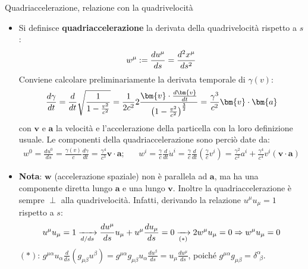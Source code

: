 \documentclass[a4_2,grid,frame]{flashcards}
\newenvironment{cartaflash}
    {\vspace{-15pt}
    \begin{itemize}
    }
    {
    \end{itemize}
    }
\begin{document}
\begin{flashcard}[Definizione]{Quadriaccelerazione, relazione con la quadrivelocità} %
\begin{cartaflash}
\item Si definisce \textbf{quadriaccelerazione} la derivata della quadrivelocità rispetto a $s$:
\vspace{-8pt}
\[
w^\mu := \frac{du^\mu}{ds} = \frac{d^2 x^\mu}{ds^2}
\vspace{-8pt}
\]
Conviene calcolare preliminariamente la derivata temporale di $\gamma(v)$:
\vspace{-8pt}
\[
\frac{d\gamma}{dt} = \frac{d}{dt}\sqrt{\frac{1}{1-\frac{v^2}{c^2}}} = \frac{1}{2c^2}2\frac{\bm{v}\cdot \frac{d\bm{v}}{dt}}{\left ( 1-\frac{v^2}{c^2}\right )^{\frac{3}{2}}} = \frac{\gamma^3}{c^2}\bm{v}\cdot \bm{a}
\vspace{-8pt}
\]
con $\bm{v}$ e $\bm{a}$ la velocità e l'accelerazione della particella con la loro definizione usuale.
Le componenti della quadriaccelerazione sono perciò date da:
\vspace{-8pt}
{
\begin{align*}
w^0 = \frac{du^0}{ds} = \frac{\gamma(v)}{c}\frac{d\gamma}{dt} = \frac{\gamma^4}{c^3}\bm{v}\cdot \bm{a};& &
w^i = \frac{\gamma}{c}\frac{d}{dt}\dot{u}^i = \frac{\gamma}{c}\frac{d}{dt}\left (\frac{\gamma}{c} v^i \right ) = \frac{\gamma^2}{c^2}a^i + \frac{\gamma^4}{c^4}v^i (\bm{v}\cdot \bm{a}) 
\end{align*}
\vspace{-20pt}
}
\item \textbf{Nota}: $\bm{w}$ (accelerazione spaziale) non è parallela ad $\bm{a}$, ma ha una componente diretta lungo $\bm{a}$ e una lungo $\bm{v}$. Inoltre la quadriaccelerazione è sempre $\perp$ alla quadrivelocità. Infatti, derivando la relazione $u^\mu u_\mu = 1$ rispetto a $s$:
\vspace{-8pt}\[
u^\mu u_\mu = 1 \xrightarrow[d/ds]{} \frac{du^\mu}{ds}u_\mu + u^\mu \frac{du_\mu}{ds} = 0 \xrightarrow[(*)]{} 2w^\mu u_\mu = 0 \Rightarrow w^\mu u_\mu = 0
\vspace{-8pt}
\]
$(*)$: $g^{\mu\alpha} u_\alpha \frac{d}{ds}(g_{\mu\beta}u^\beta) = g^{\mu\alpha}g_{\mu\beta} u_\alpha \frac{du^\beta}{ds} = u_\mu \frac{du^\mu}{ds}$, poiché $g^{\mu\alpha} g_{\mu\beta} = \delta^\alpha_{\>\>\beta}$.
\end{cartaflash}
\end{flashcard}

\end{document}
